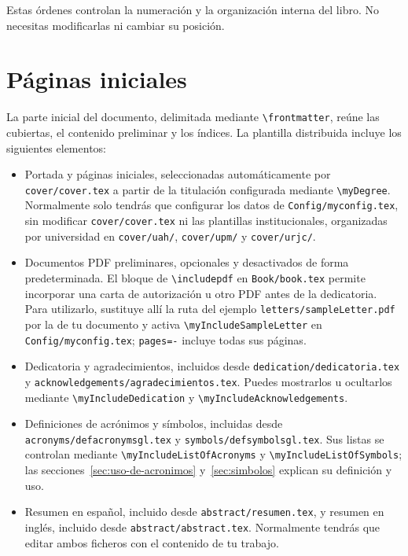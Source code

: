 Estas órdenes controlan la numeración y la organización interna del libro. No necesitas modificarlas ni cambiar su posición.

\section{Páginas iniciales}
\label{sec:paginas-iniciales}

La parte inicial del documento, delimitada mediante \texttt{\textbackslash{}frontmatter}, reúne las cubiertas, el contenido preliminar y los índices. La plantilla distribuida incluye los siguientes elementos:

\begin{itemize}
  \item Portada y páginas iniciales, seleccionadas automáticamente por \texttt{cover/cover.tex} a partir de la titulación configurada mediante \texttt{\textbackslash{}myDegree}. Normalmente solo tendrás que configurar los datos de \texttt{Config/myconfig.tex}, sin modificar \texttt{cover/cover.tex} ni las plantillas institucionales, organizadas por universidad en \texttt{cover/uah/}, \texttt{cover/upm/} y \texttt{cover/urjc/}.
  \item Documentos PDF preliminares, opcionales y desactivados de forma predeterminada. El bloque de \texttt{\textbackslash{}includepdf} en \texttt{Book/book.tex} permite incorporar una carta de autorización u otro PDF antes de la dedicatoria. Para utilizarlo, sustituye allí la ruta del ejemplo \texttt{letters/sampleLetter.pdf} por la de tu documento y activa \texttt{\textbackslash{}myIncludeSampleLetter} en \texttt{Config/myconfig.tex}; \texttt{pages=-} incluye todas sus páginas.
  \item Dedicatoria y agradecimientos, incluidos desde \texttt{dedication/dedicatoria.tex} y \texttt{acknowledgements/agradecimientos.tex}. Puedes mostrarlos u ocultarlos mediante \texttt{\textbackslash{}myIncludeDedication} y \texttt{\textbackslash{}myIncludeAcknowledgements}.
  \item Definiciones de acrónimos y símbolos, incluidas desde \texttt{acronyms/defacronymsgl.tex} y \texttt{symbols/defsymbolsgl.tex}. Sus listas se controlan mediante \texttt{\textbackslash{}myIncludeListOfAcronyms} y \texttt{\textbackslash{}myIncludeListOfSymbols}; las secciones~\ref{sec:uso-de-acronimos} y~\ref{sec:simbolos} explican su definición y uso.
  \item Resumen en español, incluido desde \texttt{abstract/resumen.tex}, y resumen en inglés, incluido desde \texttt{abstract/abstract.tex}. Normalmente tendrás que editar ambos ficheros con el contenido de tu trabajo.

\end{itemize}
